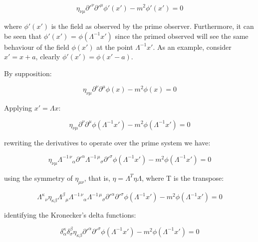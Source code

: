 \begin{equation}
\eta_{\nu \mu} \partial'^{\nu} \partial'^{\mu} \phi'(x') - m^2 \phi'(x') = 0
\label{eq1:ex2_kg_step1}
\end{equation}

where $\phi'(x')$ is the field as observed by the prime observer. Furthermore, it can be seen that $\phi'(x')$ = $\phi(\Lambda^{-1}x')$ since the primed observed will see the same behaviour of the field $\phi(x')$ at the point $\Lambda^{-1}x'$. As an example, consider $x' = x + a$, clearly  $\phi'(x') = \phi(x' - a)$.

By supposition:

\begin{equation}
\eta_{\nu \mu} \partial^{\nu} \partial^{\mu} \phi(x) - m^2 \phi(x) = 0
\label{eq1:ex2_kg_step2}
\end{equation}

Applying $x' = \Lambda x$:


\begin{equation}
\eta_{\nu \mu} \partial^{\nu} \partial^{\mu} \phi(\Lambda^{-1} x') - m^2 \phi(\Lambda^{-1} x') = 0
\label{eq1:ex2_kg_step3}
\end{equation}

rewriting the derivatives to operate over the prime system we have:

\begin{equation}
\eta_{\nu \mu} {\Lambda^{-1 \, \nu}}_{\alpha} \partial'^{\alpha} {\Lambda^{-1 \, \mu}}_{\sigma} \partial'^{\sigma} \phi(\Lambda^{-1} x') - m^2 \phi(\Lambda^{-1} x') = 0
\label{eq1:ex2_kg_step4}
\end{equation}

using the symmetry of $\eta_{\mu \nu}$, that is,  $\eta = \Lambda^{T} \eta \Lambda$, where T is the transpose:


\begin{equation}
{\Lambda^{\kappa}}_{\nu} \eta_{\kappa \beta} {\Lambda^{\beta}}_{\mu} {\Lambda^{-1 \, \nu}}_{\alpha} {\Lambda^{-1 \, \mu}}_{\sigma} \partial'^{\alpha} \partial'^{\sigma} \phi(\Lambda^{-1} x') - m^2 \phi(\Lambda^{-1} x') = 0
\label{eq1:ex2_kg_step5}
\end{equation}

identifying the Kronecker's delta functions:


\begin{equation}
\delta^{\kappa}_{\alpha} \delta^{\beta}_{\sigma} \eta_{\kappa \beta} \partial'^{\alpha} \partial'^{\sigma} \phi(\Lambda^{-1} x') - m^2 \phi(\Lambda^{-1} x') = 0
\label{eq1:ex2_kg_step6}
\end{equation}

